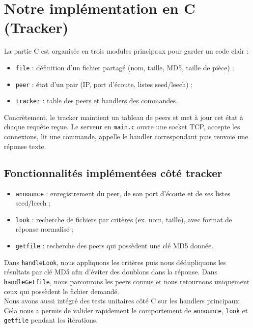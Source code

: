 \documentclass[12pt,a4paper]{article}
\begin{document}
\section{Notre implémentation en C (Tracker)}

La partie C est organisée en trois modules principaux pour garder un code clair :
\begin{itemize}[leftmargin=1.2cm]
  \item \texttt{file} : définition d’un fichier partagé (nom, taille, MD5, taille de pièce) ;
  \item \texttt{peer} : état d’un pair (IP, port d’écoute, listes seed/leech) ;
  \item \texttt{tracker} : table des peers et handlers des commandes.
\end{itemize}

\vspace{0.5em}
Concrètement, le tracker maintient un tableau de peers et met à jour cet état à chaque requête reçue. Le serveur en \texttt{main.c} ouvre une socket TCP, accepte les connexions, lit une commande, appelle le handler correspondant puis renvoie une réponse texte.

\subsection{Fonctionnalités implémentées côté tracker}

\begin{itemize}[leftmargin=1.2cm]
  \item \texttt{announce} : enregistrement du peer, de son port d’écoute et de ses listes seed/leech ;
  \item \texttt{look} : recherche de fichiers par critères (ex. nom, taille), avec format de réponse normalisé ;
  \item \texttt{getfile} : recherche des peers qui possèdent une clé MD5 donnée.
\end{itemize}

\vspace{0.5em}
Dans \texttt{handleLook}, nous appliquons les critères puis nous dédupliquons les résultats par clé MD5 afin d’éviter des doublons dans la réponse. Dans \texttt{handleGetfile}, nous parcourons les peers connus et nous retournons uniquement ceux qui possèdent le fichier demandé.\\

Nous avons aussi intégré des tests unitaires côté C sur les handlers principaux. Cela nous a permis de valider rapidement le comportement de \texttt{announce}, \texttt{look} et \texttt{getfile} pendant les itérations.
\end{document}
